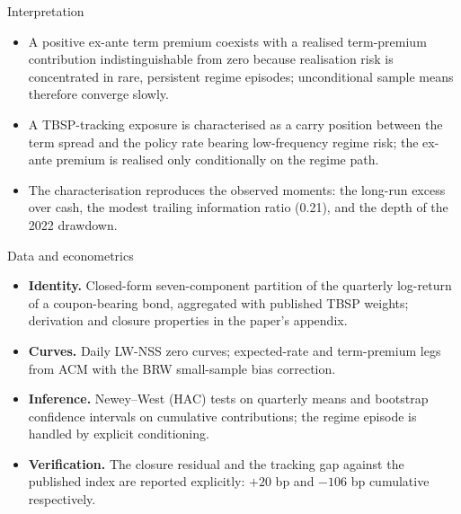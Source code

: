 \documentclass[aspectratio=169,11pt]{beamer}
\begin{document}
\begin{frame}{Interpretation}
  \small
  \begin{itemize}
    \item A positive ex-ante term premium coexists with a realised
          term-premium contribution indistinguishable from zero because
          realisation risk is concentrated in rare, persistent regime
          episodes; unconditional sample means therefore converge slowly.
    \item A TBSP-tracking exposure is characterised as a carry position
          between the term spread and the policy rate bearing low-frequency
          regime risk; the ex-ante premium is realised only conditionally on
          the regime path.
    \item The characterisation reproduces the observed moments: the long-run
          excess over cash, the modest trailing information ratio (0.21), and
          the depth of the 2022 drawdown.
  \end{itemize}
\end{frame}

\begin{frame}{Data and econometrics}
  \small
  \begin{itemize}
    \item \textbf{Identity.} Closed-form seven-component partition of the
          quarterly log-return of a coupon-bearing bond, aggregated with
          published TBSP weights; derivation and closure properties in the
          paper's appendix.
    \item \textbf{Curves.} Daily LW-NSS zero curves; expected-rate and
          term-premium legs from ACM with the BRW small-sample bias
          correction.
    \item \textbf{Inference.} Newey--West (HAC) tests on quarterly means and
          bootstrap confidence intervals on cumulative contributions; the
          regime episode is handled by explicit conditioning.
    \item \textbf{Verification.} The closure residual and the tracking gap
          against the published index are reported explicitly: $+20$ bp and
          $-106$ bp cumulative respectively.
  \end{itemize}
\end{frame}
\end{document}
